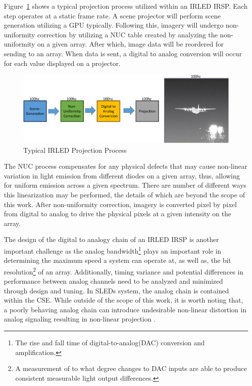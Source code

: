 Figure~\ref{fig:typical_projection} shows a typical projection process utilized within an IRLED IRSP. Each step operates at a static frame rate. A scene projector will perform scene generation utilizing a GPU typically. Following this, imagery will undergo non-uniformity correction by utilizing a NUC table created by analyzing the non-uniformity on a given array. After which, image data will be reordered for sending to an array. When data is sent, a digital to analog conversion will occur for each value displayed on a projector.

\begin{figure}
    \centering
    \includegraphics[width=1.0\textwidth]{fig/typical_projection_system.pdf}
    \caption{Typical IRLED Projection Process}
    \label{fig:typical_projection}
\end{figure}

The NUC process compensates for any physical defects that may cause non-linear variation in light emission from different diodes on a given array, thus, allowing for uniform emission across a given spectrum. There are number of different ways this linearization may be performed\cite{BrowningEtAl2016, LandwehrEtAl2017, BarakhshanEtAl2018_2, BarakhshanEtAl2019, BarakhshanEtAl2019_2}, the details of which are beyond the scope of this work. After non-uniformity correction, imagery is converted pixel by pixel from digital to analog to drive the physical pixels at a given intensity on the array.

The design of the digital to analogy chain of an IRLED IRSP is another important challenge as the analog bandwidth\footnote{The rise and fall time of digital-to-analog(DAC) conversion and amplification.} plays an important role in determining the maximum speed a system can operate at, as well as, the bit resolution\footnote{A measurement of to what degree changes to DAC inputs are able to produce consistent measurable light output differences.} of an array\cite{EjzakEtAl2019}. Additionally, timing variance and potential differences in performance between analog channels need to be analyzed and minimized through design and tuning. In SLEDs system, the analog chain is contained within the CSE. While outside of the scope of this work, it is worth noting that, a poorly behaving analog chain can introduce undesirable non-linear distortion in analog signaling resulting in non-linear projection \cite{freeman1977slewing, gordon1978linear, ChanEtAl2008}.


